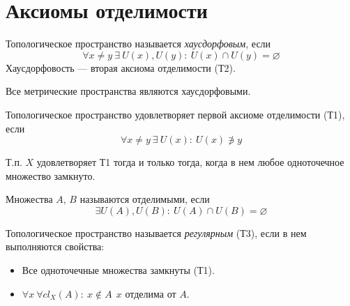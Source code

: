 \section{Аксиомы отделимости}

\begin{definition}
	Топологическое пространство называется \textit{хаусдорфовым}, 
	если 
\[
		\forall x \neq y~ \exists~ U(x), U(y)\colon~ U(x) \cap U(y) = \varnothing
\]
	Хаусдорфовость --- вторая аксиома отделимости (Т2).
\end{definition}

\begin{remark}
	Все метрические пространства являются хаусдорфовыми.
\end{remark}

\begin{definition}
	Топологическое пространство удовлетворяет первой аксиоме
	отделимости (Т1), если 
\[
	\forall x \neq y~\exists~ U(x)\colon~ U(x) \not\ni y
\]
\end{definition}

\begin{theorem}
	Т.п. $X$ удовлетворяет Т1 тогда и только тогда, когда в нем
	любое одноточечное множество замкнуто.
\end{theorem}

\begin{definition}
	Множества $A$, $B$ называются отделимыми, если 
\[
	\exists U(A), U(B)\colon~ U(A) \cap U(B) = \varnothing
\]
\end{definition}

\begin{definition}
	Топологическое пространство называется \textit{регулярным} (Т3),
	если в нем выполняются свойства:
	\begin{itemize}
		\item Все одноточечные множества замкнуты (Т1).
		\item $\forall x~ \forall cl_X(A)\colon~ x \notin A~~ x$ отделима от $A$. 
	\end{itemize}
\end{definition}

